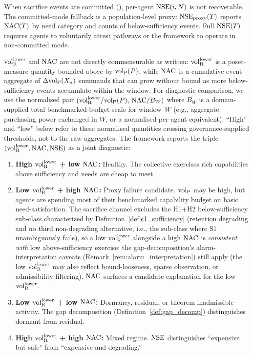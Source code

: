\begin{remark}
When sacrifice events are committed
(\citep[Revealed~Sacrifice]{lasser2026paper8a}), per-agent $\mathrm{NSE}(i, N)$ is not
recoverable.  The committed-mode fallback is a population-level
proxy: $\mathrm{NSE}_{\mathrm{proxy}}(T)$ reports $\mathrm{NAC}(T)$ by need
category and counts of below-sufficiency events.  Full $\mathrm{NSE}(T)$
requires agents to voluntarily attest pathways or the framework to
operate in non-committed mode.
\end{remark}

\begin{proposition}
\label{prop:combined_diagnostic}
${\operatorname{vol}_{\mathrm{R}}^{\mathrm{lower}}}$ and $\mathrm{NAC}$ are not directly commensurable as
written: ${\operatorname{vol}_{\mathrm{R}}^{\mathrm{lower}}}$ is a poset-measure quantity bounded above
by ${\operatorname{vol}_{\mathrm{P}}}(P)$, while $\mathrm{NAC}$ is a cumulative event aggregate of
$\Delta{\operatorname{vol}_{\mathrm{P}}}(X_n)$ summands that can grow without bound as more
below-sufficiency events accumulate within the window.  For
diagnostic comparison, we use the normalised pair
$({\operatorname{vol}_{\mathrm{R}}^{\mathrm{lower}}} / {\operatorname{vol}_{\mathrm{P}}}(P),\, \mathrm{NAC} / B_W)$ where $B_W$ is a
domain-supplied total benchmarked-budget scale for window~$W$
(e.g., aggregate purchasing power exchanged in $W$, or a
normalised-per-agent equivalent).  ``High'' and ``low'' below
refer to these normalised quantities crossing
governance-supplied thresholds, not to the raw aggregates.  The
framework reports the triple
$({\operatorname{vol}_{\mathrm{R}}^{\mathrm{lower}}}, \mathrm{NAC}, \mathrm{NSE})$ as a joint diagnostic:
\begin{enumerate}
\item[(a)] \textbf{High ${\operatorname{vol}_{\mathrm{R}}^{\mathrm{lower}}}$ + low $\mathrm{NAC}$:} Healthy.
  The collective exercises rich capabilities above sufficiency
  and needs are cheap to meet.
\item[(b)] \textbf{Low ${\operatorname{vol}_{\mathrm{R}}^{\mathrm{lower}}}$ + high $\mathrm{NAC}$:} Proxy
  failure candidate.  ${\operatorname{vol}_{\mathrm{P}}}$ may be high, but agents are
  spending most of their benchmarked capability budget on
  basic need-satisfaction.  The sacrifice channel excludes the
  H1+H2 below-sufficiency sub-class characterized by
  Definition~\ref{def:s1_sufficiency} (retention degrading and
  no third non-degrading alternative, i.e., the sub-class where
  S1 unambiguously fails), so a low ${\operatorname{vol}_{\mathrm{R}}^{\mathrm{lower}}}$
  alongside a high $\mathrm{NAC}$ is \emph{consistent with} low
  above-sufficiency exercise; the gap-decomposition's
  alarm-interpretation caveats
  (Remark~\ref{rem:alarm_interpretation}) still apply (the low
  ${\operatorname{vol}_{\mathrm{R}}^{\mathrm{lower}}}$ may also reflect bound-looseness, sparse
  observation, or admissibility filtering).  $\mathrm{NAC}$ surfaces a
  candidate explanation for the low ${\operatorname{vol}_{\mathrm{R}}^{\mathrm{lower}}}$.
\item[(c)] \textbf{Low ${\operatorname{vol}_{\mathrm{R}}^{\mathrm{lower}}}$ + low $\mathrm{NAC}$:} Dormancy,
  residual, or theorem-inadmissible activity.  The gap
  decomposition (Definition~\ref{def:gap_decomp}) distinguishes
  dormant from residual.
\item[(d)] \textbf{High ${\operatorname{vol}_{\mathrm{R}}^{\mathrm{lower}}}$ + high $\mathrm{NAC}$:} Mixed
  regime.  $\mathrm{NSE}$ distinguishes ``expensive but safe'' from
  ``expensive and degrading.''
\end{enumerate}
\end{proposition}

